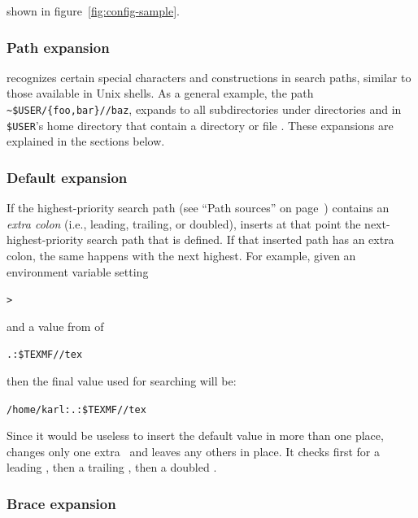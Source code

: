 \documentclass[12pt]{article}
\begin{document}

\else
shown in figure~\ref{fig:config-sample}.
\fi

\subsubsection{Path expansion}
\label{sec:path-expansion}

\KPS{} recognizes certain special characters and constructions in
search paths, similar to those available in Unix shells.  As a
general example, the path
\verb+~$USER/{foo,bar}//baz+, expands to all subdirectories under
directories  and  in \texttt{\$USER}'s home
directory that contain a directory or file .  These
expansions are explained in the sections below.
\subsubsection{Default expansion}
\label{sec:default-expansion}

If the highest-priority search path (see ``Path sources'' on
page~\pageref{sec:path-sources}) contains an \emph{extra colon} (i.e.,
leading, trailing, or doubled), \KPS{} inserts at that point the
next-highest-prio\-rity search path that is defined.  If that inserted
path has an extra colon, the same happens with the next highest.  For
example, given an environment variable setting

\begin{alltt}
> 
\end{alltt}
and a  value from  of

\begin{alltt}
  .:\$TEXMF//tex
\end{alltt}
then the final value used for searching will be:

\begin{alltt}
  /home/karl:.:\$TEXMF//tex
\end{alltt}

Since it would be useless to insert the default value in more than one
place, \KPS{} changes only one extra \samp{:}\ and leaves any others in
place.  It checks first for a leading \samp{:}, then a trailing
\samp{:}, then a doubled \samp{:}.

\subsubsection{Brace expansion}
\label{sec:brace-expansion}
\end{document}

